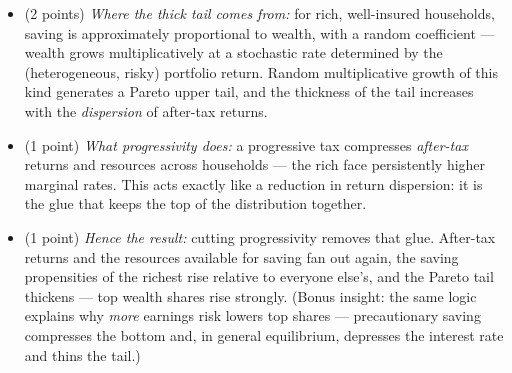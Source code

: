 \begin{parts}
    \begin{solutionorbox}[12cm]
        \begin{itemize}
            \item (2 points) \emph{Where the thick tail comes from:} for rich, well-insured households, saving is approximately proportional to wealth, with a random coefficient — wealth grows multiplicatively at a stochastic rate determined by the (heterogeneous, risky) portfolio return. Random multiplicative growth of this kind generates a Pareto upper tail, and the thickness of the tail increases with the \emph{dispersion} of after-tax returns.
            \item (1 point) \emph{What progressivity does:} a progressive tax compresses \emph{after-tax} returns and resources across households — the rich face persistently higher marginal rates. This acts exactly like a reduction in return dispersion: it is the glue that keeps the top of the distribution together.
            \item (1 point) \emph{Hence the result:} cutting progressivity removes that glue. After-tax returns and the resources available for saving fan out again, the saving propensities of the richest rise relative to everyone else's, and the Pareto tail thickens — top wealth shares rise strongly. (Bonus insight: the same logic explains why \emph{more} earnings risk lowers top shares — precautionary saving compresses the bottom and, in general equilibrium, depresses the interest rate and thins the tail.)
        \end{itemize}
    \end{solutionorbox}
\end{parts}
